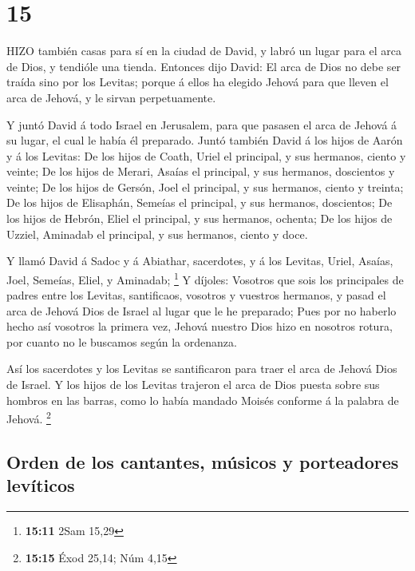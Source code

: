 \hypertarget{section-14}{%
\section{15}\label{section-14}}

 HIZO también casas para sí en la ciudad de David, y labró
un lugar para el arca de Dios, y tendióle una tienda. 
Entonces dijo David: El arca de Dios no debe ser traída sino por los
Levitas; porque á ellos ha elegido Jehová para que lleven el arca de
Jehová, y le sirvan perpetuamente.

 Y juntó David á todo Israel en Jerusalem, para que pasasen
el arca de Jehová á su lugar, el cual le había él preparado.
 Juntó también David á los hijos de Aarón y á los Levitas:
 De los hijos de Coath, Uriel el principal, y sus hermanos,
ciento y veinte;  De los hijos de Merari, Asaías el
principal, y sus hermanos, doscientos y veinte;  De los
hijos de Gersón, Joel el principal, y sus hermanos, ciento y treinta;
 De los hijos de Elisaphán, Semeías el principal, y sus
hermanos, doscientos;  De los hijos de Hebrón, Eliel el
principal, y sus hermanos, ochenta;  De los hijos de
Uzziel, Aminadab el principal, y sus hermanos, ciento y doce.

 Y llamó David á Sadoc y á Abiathar, sacerdotes, y á los
Levitas, Uriel, Asaías, Joel, Semeías, Eliel, y Aminadab; \footnote{\textbf{15:11}
  2Sam 15,29}  Y díjoles: Vosotros que sois los principales
de padres entre los Levitas, santificaos, vosotros y vuestros hermanos,
y pasad el arca de Jehová Dios de Israel al lugar que le he preparado;
 Pues por no haberlo hecho así vosotros la primera vez,
Jehová nuestro Dios hizo en nosotros rotura, por cuanto no le buscamos
según la ordenanza.

 Así los sacerdotes y los Levitas se santificaron para
traer el arca de Jehová Dios de Israel.  Y los hijos de los
Levitas trajeron el arca de Dios puesta sobre sus hombros en las barras,
como lo había mandado Moisés conforme á la palabra de Jehová.
\footnote{\textbf{15:15} Éxod 25,14; Núm 4,15}

\hypertarget{orden-de-los-cantantes-muxfasicos-y-porteadores-levuxedticos}{%
\subsection{Orden de los cantantes, músicos y porteadores
levíticos}\label{orden-de-los-cantantes-muxfasicos-y-porteadores-levuxedticos}}

